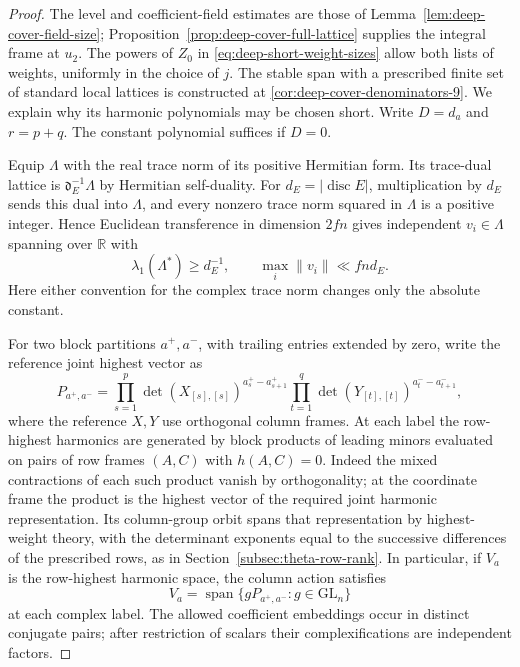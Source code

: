 \begin{proof}
The level and coefficient-field estimates are those of Lemma~\ref{lem:deep-cover-field-size}; Proposition~\ref{prop:deep-cover-full-lattice} supplies the integral frame at \(u_2\). The powers of \(Z_0\) in \eqref{eq:deep-short-weight-sizes} allow both lists of weights, uniformly in the choice of \(j\). The stable span with a prescribed finite set of standard local lattices is constructed at \ref{cor:deep-cover-denominators-9}. We explain why its harmonic polynomials may be chosen short. Write \(D=d_a\) and \(r=p+q\). The constant polynomial suffices if \(D=0\).

Equip \(\Lambda\) with the real trace norm of its positive Hermitian form. Its trace-dual lattice is \(\mathfrak d_E^{-1}\Lambda\) by Hermitian self-duality. For \(d_E=|\operatorname{disc} E|\), multiplication by \(d_E\) sends this dual into \(\Lambda\), and every nonzero trace norm squared in \(\Lambda\) is a positive integer. Hence Euclidean transference in dimension \(2fn\) gives independent \(v_i\in\Lambda\) spanning over \(\mathbb R\) with
\[
        \lambda_1(\Lambda^*)\ge d_E^{-1},\qquad
        \max_i\|v_i\|\ll fn d_E.
\]
Here either convention for the complex trace norm changes only the absolute constant. \cite{banaszczyk}

For two block partitions \(a^+,a^-\), with trailing entries extended by zero, write the reference joint highest vector as
\[
  P_{a^+,a^-}=\prod_{s=1}^{p}\det(X_{[s],[s]})^{a_s^+-a_{s+1}^+}
          \prod_{t=1}^{q}\det(Y_{[t],[t]})^{a_t^--a_{t+1}^-},
\]
where the reference \(X,Y\) use orthogonal column frames. At each label the row-highest harmonics are generated by block products of leading minors evaluated on pairs of row frames \((A,C)\) with \(h(A,C)=0\). Indeed the mixed contractions of each such product vanish by orthogonality; at the coordinate frame the product is the highest vector of the required joint harmonic representation. Its column-group orbit spans that representation by highest-weight theory, with the determinant exponents equal to the successive differences of the prescribed rows, as in Section~\ref{subsec:theta-row-rank}. In particular, if \(V_a\) is the row-highest harmonic space, the column action satisfies
\[
      V_a=\operatorname{span}\{gP_{a^+,a^-}:g\in\mathrm{GL}_n\}
\]
at each complex label. The allowed coefficient embeddings occur in distinct conjugate pairs; after restriction of scalars their complexifications are independent factors.


\end{proof}
